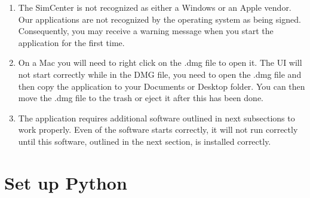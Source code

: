 

\begin{enumerate}
\item The SimCenter is not recognized as either a Windows or an Apple vendor. Our applications are not recognized by the operating system as being signed. Consequently, you may receive a warning message when you start the \texttt{\getsoftwarename{}} application for the first time.
\item  On a Mac you will need to right click on the .dmg file to open it. The UI will not start correctly while in the DMG file, you need to open the .dmg file and then copy the \texttt{\getsoftwarename{}} application to your Documents or Desktop folder. You can then move the .dmg file to the trash or eject it after this has been done.
\item  The \texttt{\getsoftwarename{}} application requires additional software outlined in next subsections to work properly. Even of the software starts correctly, it will not run correctly until this software, outlined in the next section, is installed correctly.
\end{enumerate}


\section{Set up Python}

